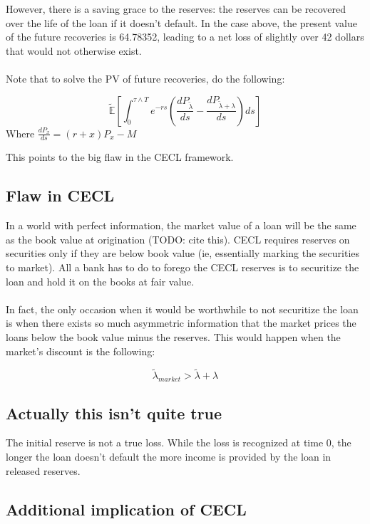 \documentclass{article}
\begin{document}
However, there is a saving grace to the reserves: the reserves can be recovered over the life of the loan if it doesn't default.  In the case above, the present value of the future recoveries is 64.78352, leading to a net loss of slightly over 42 dollars that would not otherwise exist.
\\
\\
Note that to solve the PV of future recoveries, do the following:

\[\mathbb{\tilde{E}}\left[\int_0^{\tau \wedge T} e^{-rs}\left(\frac{dP_{\tilde{\lambda}}}{ds}-\frac{dP_{\tilde{\lambda}+\lambda}}{ds}\right) ds\right]\]
Where \(\frac{dP_{x}}{ds}=(r+x)P_{x}-M\)


This points to the big flaw in the CECL framework.  

\subsection{Flaw in CECL}

In a world with perfect information, the market value of a loan will be the same as the book value at origination (TODO: cite this).  CECL requires reserves on securities only if they are below book value (ie, essentially marking the securities to market).  All a bank has to do to forego the CECL reserves is to securitize the loan and hold it on the books at fair value.  
\\
\\
In fact, the only occasion when it would be worthwhile to not securitize the loan is when there exists so much asymmetric information that the market prices the loans below the book value minus the reserves.  This would happen when the market's discount is the following:

\[\tilde{\lambda}_{market} > \tilde{\lambda}+\lambda\]

\subsection{Actually this isn't quite true}

The initial reserve is not a true loss.  While the loss is recognized at time \(0\), the longer the loan doesn't default the more income is provided by the loan in released reserves.  

\subsection{Additional implication of CECL}
\end{document}
